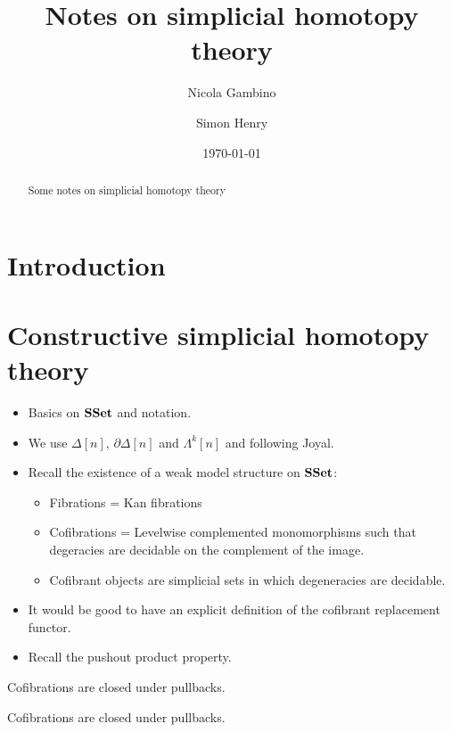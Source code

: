 \documentclass[reqno,10pt,a4paper,oneside,draft]{amsart}
\title[]{Notes on simplicial homotopy theory}
\begin{document}
\begin{abstract}
Some notes on simplicial homotopy theory
\end{abstract}

\author{Nicola Gambino}

\author{Simon Henry}


 \date{\today}

\maketitle

\section{Introduction}

\newpage

\section{Constructive simplicial homotopy theory}

\begin{itemize}
\item Basics on $\mathbf{SSet}$ and notation. 
\item We use $\Delta[n]$, $\partial \Delta[n]$ and $\Lambda^{k}[n]$ and following Joyal.
\item Recall the existence of a weak model structure on $\mathbf{SSet}$:
\begin{itemize}
\item Fibrations  = Kan fibrations
\item Cofibrations = Levelwise complemented monomorphisms such that degeracies are decidable on the complement of the image. 
\item Cofibrant objects are simplicial sets in which degeneracies are decidable.
\end{itemize}
\item It would be good to have an explicit definition of the cofibrant replacement functor.
\item Recall the pushout product property.
\end{itemize}


\begin{lemma} \label{thm:cof-pbk} Cofibrations are closed under pullbacks.
\end{lemma}



\begin{proposition} Cofibrations are closed under pullbacks.
\end{proposition}
\end{document}

